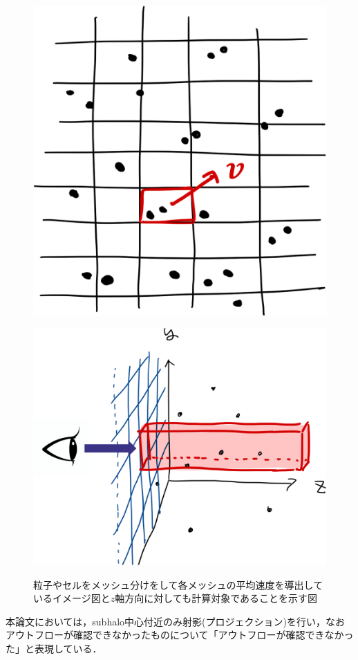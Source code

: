 \begin{figure}
	\centering
	
	\begin{minipage}[b]{0.33\linewidth}
		\centering
		\includegraphics[width=\linewidth]{./pic/outflow_ex4.png}
		\subcaption{}
		\label{}
	\end{minipage}
	\begin{minipage}[b]{0.45\linewidth}
		\centering
		\includegraphics[width=\linewidth]{./pic/outflow_ex5.png}
		\subcaption{}
		\label{}
	\end{minipage}
	\captionsetup{width=0.9\linewidth}
	\caption{粒子やセルをメッシュ分けをして各メッシュの平均速度を導出しているイメージ図と$z$軸方向に対しても計算対象であることを示す図}
	\label{fig:calc_outflow}
\end{figure}

本論文においては，subhalo中心付近のみ射影(プロジェクション)を行い，なおアウトフローが確認できなかったものについて「アウトフローが確認できなかった」と表現している．